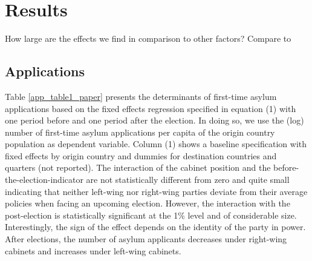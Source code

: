 \documentclass[a4paper,12pt]{article}
\begin{document}
\section{Results} \label{sec:results}

How large are the effects we find in comparison to other factors? Compare to \citet{thielemann2006}

\subsection{Applications}

Table \ref{app_table1_paper} presents the determinants of first-time asylum applications based on the fixed effects regression specified in equation (1) with one period before and one period after the election. In doing so, we use the (log) number of first-time asylum applications per capita of the origin country population as dependent variable. Column (1) shows a baseline specification with fixed effects by origin country and dummies for destination countries and quarters (not reported). The interaction of the cabinet position and the before-the-election-indicator are not statistically different from zero and quite small indicating that neither left-wing nor right-wing parties deviate from their average policies when facing an upcoming election. However, the interaction with the post-election is statistically significant at the 1\% level and of considerable size. Interestingly, the sign of the effect depends on the identity of the party in power. After elections, the number of asylum applicants decreases under right-wing cabinets and increases under left-wing cabinets. 
\end{document}
